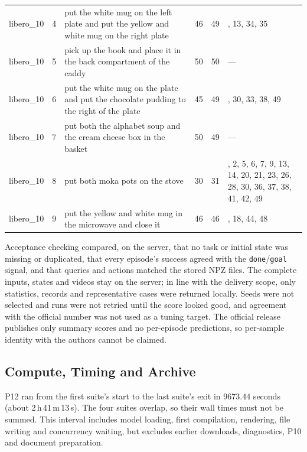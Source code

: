 {\begin{longtable}{@{}l r p{6.6cm} r r >{\raggedright\arraybackslash}p{1.6cm}@{}}
    libero\_10 & 4 & put the white mug on the left plate and put the yellow and white mug on the right plate & 46 & 49 & 7, 13, 34, 35 \\
    libero\_10 & 5 & pick up the book and place it in the back compartment of the caddy & 50 & 50 & --- \\
    libero\_10 & 6 & put the white mug on the plate and put the chocolate pudding to the right of the plate & 45 & 49 & 27, 30, 33, 38, 49 \\
    libero\_10 & 7 & put both the alphabet soup and the cream cheese box in the basket & 50 & 49 & --- \\
    libero\_10 & 8 & put both moka pots on the stove & 30 & 31 & 0, 2, 5, 6, 7, 9, 13, 14, 20, 21, 23, 26, 28, 30, 36, 37, 38, 41, 42, 49 \\
    libero\_10 & 9 & put the yellow and white mug in the microwave and close it & 46 & 46 & 3, 18, 44, 48 \\
\end{longtable}}

Acceptance checking compared, on the server, that no task or initial state was
missing or duplicated, that every episode's success agreed with the
\texttt{done}/\texttt{goal} signal, and that queries and actions matched the
stored NPZ files. The complete inputs, states and videos stay on the server; in
line with the delivery scope, only statistics, records and representative cases
were returned locally. Seeds were not selected and runs were not retried until
the score looked good, and agreement with the official number was not used as a
tuning target. The official release publishes only summary scores and no
per-episode predictions, so per-sample identity with the authors cannot be
claimed.

\subsection{Compute, Timing and Archive}
\label{sec:pi05-compute}

P12 ran from the first suite's start to the last suite's exit in 9673.44 seconds
(about 2\,h\,41\,m\,13\,s). The four suites overlap, so their wall times must
not be summed. This interval includes model loading, first compilation,
rendering, file writing and concurrency waiting, but excludes earlier downloads,
diagnostics, P10 and document preparation.

